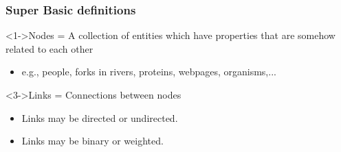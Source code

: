 
\begin{frame}
  \frametitle{Super Basic definitions}

  \begin{block}<1->{\alert{Nodes} = A collection of entities 
      which have properties that
      are somehow related to each other}
    \begin{itemize}
    \item <2-> 
      e.g., people, forks in rivers, proteins, webpages, organisms,...
    \end{itemize}
  \end{block}

  \begin{block}<3->{\alert{Links} = Connections between nodes}
    \begin{itemize}
    \item<4->
      \alert{Links} may be directed or undirected.
    \item<5->
      \alert{Links} may be binary or weighted.
    \end{itemize}
  \end{block}


\end{frame}


